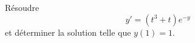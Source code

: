 

\begin{exercice}\label{exo_II-1-03}

Résoudre 
\begin{equation}
	y'=(t^3+t) e^{-y}
\end{equation}
et déterminer la solution telle que $y(1)=1$.

\end{exercice}
